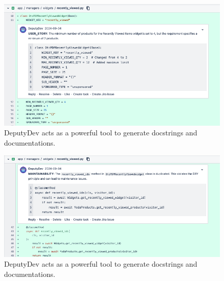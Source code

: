 \begin{appendices}
\begin{figure}[htbp]
    \centering
    \includegraphics[scale=0.40]
    {Figures/dd_comm_story.png}
    \caption{DeputyDev acts as a powerful tool to generate docstrings and documentations.}
    \label{fig:dd_comm_story}
\end{figure}

\begin{figure}[htbp]
    \centering
    \includegraphics[scale=0.40]
    {Figures/dd_comm_maint.png}
    \caption{DeputyDev acts as a powerful tool to generate docstrings and documentations.}
    \label{fig:dd_comm_maint}
\end{figure}


\end{appendices}
